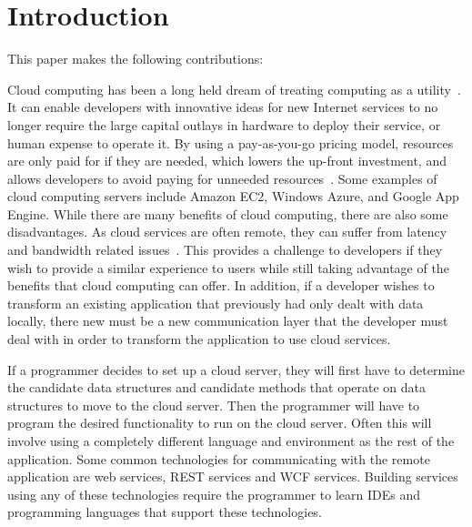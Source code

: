 \documentclass{sigplanconf}
\begin{document}
\section{Introduction}






This paper makes the following contributions:


Cloud computing has been a long held dream of treating computing as a utility~\cite{Armbrust:2010:VCC:1721654.1721672}.  It can enable developers with innovative ideas for new Internet services to no longer require the large capital outlays in hardware to deploy their service, or human expense to operate it.  By using a pay-as-you-go pricing model, resources are only paid for if they are needed, which lowers the up-front investment, and allows developers to avoid paying for unneeded resources~\cite{zhang2010cloud}.  Some examples of cloud computing servers include Amazon EC2, Windows Azure, and Google App Engine.  While there are many benefits of cloud computing, there are also some disadvantages. As cloud services are often remote, they can suffer from latency and bandwidth related issues~\cite{4804045}.  This provides a challenge to developers if they wish to provide a similar experience to users while still taking advantage of the benefits that cloud computing can offer.  In addition, if a developer wishes to transform an existing application that previously had only dealt with data locally, there new must be a new communication layer that the developer must deal with 
in order to transform the application to use cloud services.  

If a programmer decides to set up a cloud server, they will first have to determine the candidate data structures and candidate methods that operate on data structures to move to the cloud server. Then the programmer will have to program the desired functionality to run on the cloud server.  Often this will involve using a completely different language and environment as the rest of the application.  Some common technologies for communicating with the remote application are web services, REST services and WCF services. Building services using any of these technologies require the programmer to learn IDEs and programming languages that support these technologies.
\end{document}
